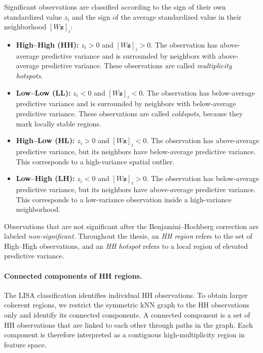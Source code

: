 Significant observations are classified according to the sign of their own standardized
value $z_i$ and the sign of the average standardized value in their neighborhood
$[W\mathbf{z}]_i$:

\begin{itemize}
  \item \textbf{High--High (HH):} $z_i > 0$ and $[W\mathbf{z}]_i > 0$. The observation has
  above-average predictive variance and is surrounded by neighbors with above-average
  predictive variance. These observations are called \emph{multiplicity hotspots}.

  \item \textbf{Low--Low (LL):} $z_i < 0$ and $[W\mathbf{z}]_i < 0$. The observation has
  below-average predictive variance and is surrounded by neighbors with below-average
  predictive variance. These observations are called \emph{coldspots}, because they mark
  locally stable regions.

  \item \textbf{High--Low (HL):} $z_i > 0$ and $[W\mathbf{z}]_i < 0$. The observation has
  above-average predictive variance, but its neighbors have below-average predictive
  variance. This corresponds to a high-variance spatial outlier.

  \item \textbf{Low--High (LH):} $z_i < 0$ and $[W\mathbf{z}]_i > 0$. The observation has
  below-average predictive variance, but its neighbors have above-average predictive
  variance. This corresponds to a low-variance observation inside a high-variance
  neighborhood.
\end{itemize}

Observations that are not significant after the Benjamini--Hochberg correction are labeled
\emph{non-significant}. Throughout the thesis, an \emph{HH region} refers to the set of
High--High observations, and an \emph{HH hotspot} refers to a local region of elevated
predictive variance.

\paragraph{Connected components of HH regions.}

The LISA classification identifies individual HH observations. To obtain larger coherent
regions, we restrict the symmetric kNN graph to the HH observations only and identify
its connected components. A connected component is a set of HH observations that are
linked to each other through paths in the graph. Each component is therefore interpreted
as a contiguous high-multiplicity region in feature space.

